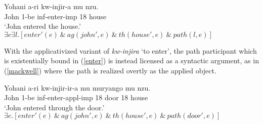 \documentclass[output=paper]{langsci/langscibook}
\begin{document}
\begin{exe}
	\ex\label{enter}\begin{xlist}
		\ex\gll Yohani a-ri kw-injir-a mu nzu.\\
				John 1{\sc-be} {\sc inf-}enter-{\sc imp} 18 house\\
				\glt `John entered the house.'
		\ex $\exists e\exists l.[enter'(e) \ \&\ ag(john', e)  \ \&\ th(house', e)  \ \&\ path(l,e)]$
		\end{xlist}
		\end{exe}
With the applicativized variant of  \emph{kw-injira} `to enter', the {\sc path}  participant which is existentially bound in (\ref{enter}) is  instead licensed as a syntactic argument, as in (\ref{mackwell}) where  the {\sc path}  is realized overtly as the applied object.
	\begin{exe}
	\ex\label{mackwell}\begin{xlist}
		\ex\gll Yohani a-ri kw-injir-ir-a mu muryango mu nzu.\\
				John 1{\sc-be} {\sc inf-}enter-{\sc appl-imp} 18 door 18 house\\
				\glt `John entered through the door.'
	 \ex $\exists e.[enter'(e) \ \&\ ag(john', e)  \ \&\ th(house', e)  \ \&\ path(door', e) ]$
	\end{xlist}
\end{exe}
%

\end{document}
